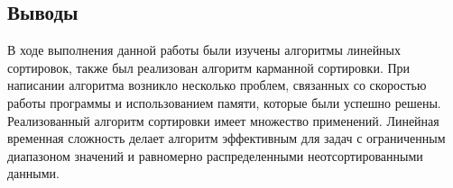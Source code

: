 \documentclass[12pt]{article}
\begin{document}
\subsection*{Выводы}

В ходе выполнения данной работы были изучены алгоритмы линейных сортировок, также был реализован алгоритм карманной сортировки. При написании алгоритма возникло несколько проблем, связанных со скоростью работы программы и использованием памяти, которые были успешно решены. Реализованный алгоритм сортировки имеет множество применений. Линейная временная сложность делает алгоритм эффективным для задач с ограниченным диапазоном значений и равномерно распределенными неотсортированными данными.
\end{document}

